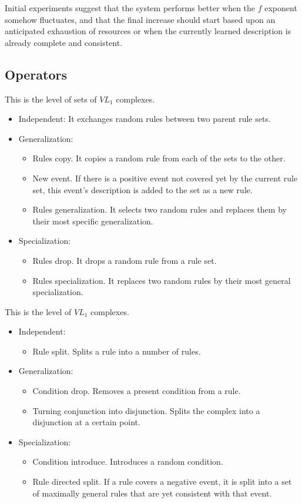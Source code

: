 \documentclass[12pt]{book}
\newcounter{subsubsubsection}[subsubsection]
\begin{document}
Initial experiments suggest that the system performs better when the $f$ exponent somehow fluctuates, and that the final increase should start based upon an anticipated exhaustion of resources or when the currently learned description is already complete and consistent.

\subsection{Operators}
This is the level of sets of $VL_1$ complexes.
\begin{itemize}
\item Independent: It exchanges random rules between two parent rule sets.
\item Generalization:
\begin{itemize}
\item Rules copy. It copies a random rule from each of the sets to the other.
\item New event. If there is a positive event not covered yet by the current rule set, this event's description is added to the set as a new rule.
\item Rules generalization. It selects two random rules and replaces them by their most specific generalization.
\end{itemize}
\item Specialization:
\begin{itemize}
\item Rules drop. It drops a random rule from a rule set.
\item Rules specialization. It replaces two random rules by their most general specialization.
\end{itemize}
\end{itemize}

This is the level of $VL_1$ complexes.
\begin{itemize}
\item Independent:
\begin{itemize}
\item Rule split. Splits a rule into a number of rules.
\end{itemize}
\item Generalization:
\begin{itemize}
\item Condition drop. Removes a present condition from a rule.
\item Turning conjunction into disjunction. Splits the complex into a disjunction at a certain point.
\end{itemize}
\item Specialization:
\begin{itemize}
\item Condition introduce. Introduces a random condition.
\item Rule directed split. If a rule covers a negative event, it is split into a set of maximally general rules that are yet consistent with that event.
\end{itemize}
\end{itemize}
\end{document}
